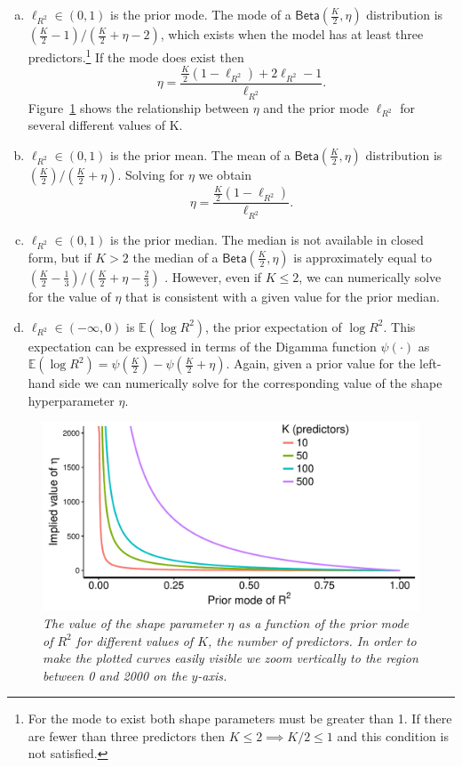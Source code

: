 \documentclass[11pt]{article}
\newcommand{\locRsq}{\ell_{R^2}}
\newcommand{\halfK}{\frac{K}{2}}
\newcommand{\Betadist}[2]{\mathsf{Beta}\left(#1,#2\right)}
\newcommand{\Digamma}[1]{\psi\left(#1\right)}
\begin{document}
\begin{enumerate}[(a)]
\item $\locRsq \in \left(0,1\right)$ is the prior mode. The mode of a
$\Betadist{\halfK}{\eta}$ distribution is \newline
$\left(\halfK - 1\right) / \left(\halfK + \eta - 2\right)$, which
exists when the model has at least three predictors.\footnote{
For the mode to exist both shape parameters must be greater than 1.
If there are fewer than three predictors then $K \leq 2 \implies K/2 \leq 1$
and this condition is not satisfied.
}
If the mode does exist then
$$\eta = \frac{\halfK \left(1 - \locRsq\right) + 2\locRsq - 1}{\locRsq}.$$
Figure~\ref{fig:etavslocplot} shows the relationship between $\eta$ and the
prior mode $\locRsq$ for several different values of K.

\item $\locRsq \in \left(0,1\right)$ is the prior mean. The mean of a
$\Betadist{\halfK}{\eta}$ distribution is \newline
$\left(\halfK\right) / \left(\halfK + \eta\right)$. Solving for $\eta$
we obtain $$\eta = \frac{\halfK \left(1 - \locRsq \right)}{\locRsq}.$$

\item $\locRsq \in \left(0,1\right)$ is the prior median. The median is not
available in closed form, but if $K > 2$ the median of a
$\Betadist{\halfK}{\eta}$ is approximately equal to
$\left(\halfK - \frac{1}{3}\right) / \left(\halfK + \eta - \frac{2}{3}\right)$
\cite{kerman}. However, even if $K \leq 2$, we can numerically solve for the
value of $\eta$ that is consistent with a given value for the prior median.

\item $\locRsq \in \left(-\infty,0\right)$ is
$\mathbb{E}\left(\log{R^2}\right)$, the prior expectation of $\log{R^2}$. This
expectation can be expressed in terms of the Digamma function $\Digamma{\cdot}$
as
$\mathbb{E}\left(\log{R^2}\right) = \Digamma{\halfK} - \Digamma{\halfK + \eta}$.
Again, given a prior value for the left-hand side we can numerically solve for
the corresponding value of the shape hyperparameter $\eta$.
\end{enumerate}

\begin{figure}
\centering
\includegraphics[width=.67\textwidth]{eta_vs_location_plot.pdf}{\vspace{-.25cm}}
\caption{\em \small The value of the shape parameter $\eta$ as a function of
the prior mode of $R^2$ for different values of $K$, the number of predictors.
In order to make the plotted curves easily visible we zoom vertically to the
region between 0 and 2000 on the $y$-axis.}
\label{fig:etavslocplot}
\end{figure}
\end{document}
